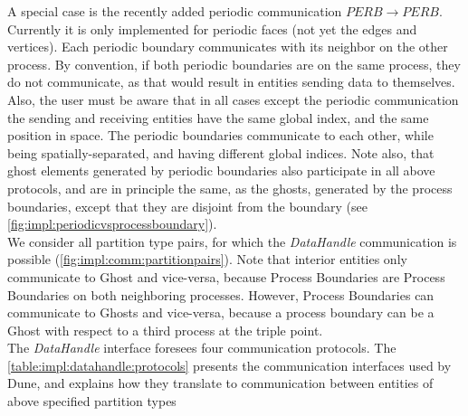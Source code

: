 \noindent
A special case is the recently added periodic communication $PERB \rightarrow PERB$. Currently it is only implemented for periodic faces (not yet the edges and vertices). Each periodic boundary communicates with its neighbor on the other process. By convention, if both periodic boundaries are on the same process, they do not communicate, as that would result in entities sending data to themselves. Also, the user must be aware that in all cases except the periodic communication the sending and receiving entities have the same global index, and the same position in space. The periodic boundaries communicate to each other, while being spatially-separated, and having different global indices. Note also, that ghost elements generated by periodic boundaries also participate in all above protocols, and are in principle the same, as the ghosts, generated by the process boundaries, except that they are disjoint from the boundary (see \cref{fig:impl:periodicvsprocessboundary}). \\


\noindent
We consider all partition type pairs, for which the \textit{DataHandle} communication is possible (\cref{fig:impl:comm:partitionpairs}). Note that interior entities only communicate to Ghost and vice-versa, because Process Boundaries are Process Boundaries on both neighboring processes. However, Process Boundaries can communicate to Ghosts and vice-versa, because a process boundary can be a Ghost with respect to a third process at the triple point. \\

\noindent
The \textit{DataHandle} interface foresees four communication protocols. The \cref{table:impl:datahandle:protocols} presents the communication interfaces used by Dune, and explains how they translate to communication between entities of above specified partition types \\

